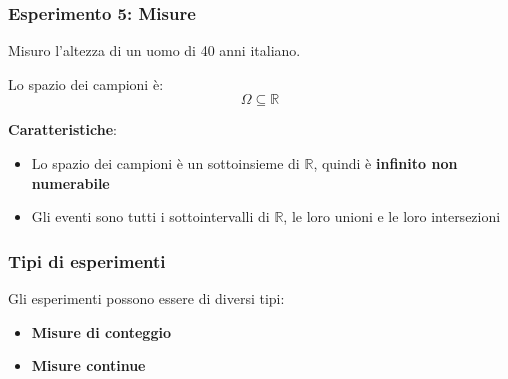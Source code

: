 \documentclass[a4paper]{article}
\theoremstyle{break}
\theoremstyle{break}
\theoremstyle{break}
\theoremstyle{break}
\begin{document}
\subsubsection{Esperimento 5: Misure}
Misuro l’altezza di un uomo di 40 anni italiano.

\noindent Lo spazio dei campioni è:
\[
	\Omega \subseteq \mathbb{R}
\]

\textbf{Caratteristiche}:
\begin{itemize}
	\item Lo spazio dei campioni è un sottoinsieme di \( \mathbb{R} \), quindi è
	      \textbf{infinito non numerabile}
	\item Gli eventi sono tutti i sottointervalli di \( \mathbb{R} \), le loro unioni e le
	      loro intersezioni
\end{itemize}

\subsubsection{Tipi di esperimenti}
Gli esperimenti possono essere di diversi tipi:
\begin{itemize}
	\item \textbf{Misure di conteggio}
	\item \textbf{Misure continue}
\end{itemize}
\end{document}
